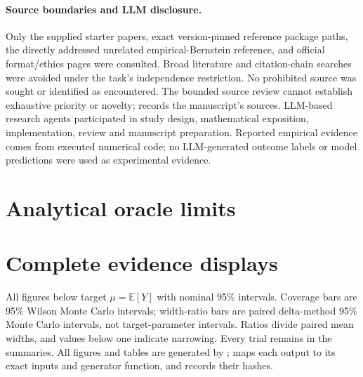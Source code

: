 \paragraph{Source boundaries and LLM disclosure.}
Only the supplied starter papers, exact version-pinned reference package paths, the directly addressed unrelated empirical-Bernstein reference, and official format/ethics pages were consulted. Broad literature and citation-chain searches were avoided under the task's independence restriction. No prohibited source was sought or identified as encountered. The bounded source review cannot establish exhaustive priority or novelty;  records the manuscript's sources. LLM-based research agents participated in study design, mathematical exposition, implementation, review and manuscript preparation. Reported empirical evidence comes from executed numerical code; no LLM-generated outcome labels or model predictions were used as experimental evidence.

\section{Analytical oracle limits}\label{app:oracle}
\begin{table}[ht]
\caption{Analytical leading-order width ratios within the score-control class. The oracle uses $h^*=\mathbb E[Y\mid S]/(1+n/N)$; the scalar uses its population-optimal unrestricted coefficient. Entries are square roots of exact variances from \texttt{code/theory.py}, rendered by \texttt{presentation/render.py}. They are theoretical predictions, not measured widths or finite-sample coverage guarantees.}
\centering
\end{table}


\clearpage
\section{Complete evidence displays}\label{app:displays}
All figures below target $\mu=\mathbb E[Y]$ with nominal 95\% intervals. Coverage bars are 95\% Wilson Monte Carlo intervals; width-ratio bars are paired delta-method 95\% Monte Carlo intervals, not target-parameter intervals. Ratios divide paired mean widths, and values below one indicate narrowing. Every trial remains in the summaries. All figures and tables are generated by ;  maps each output to its exact inputs and generator function, and  records their hashes.

